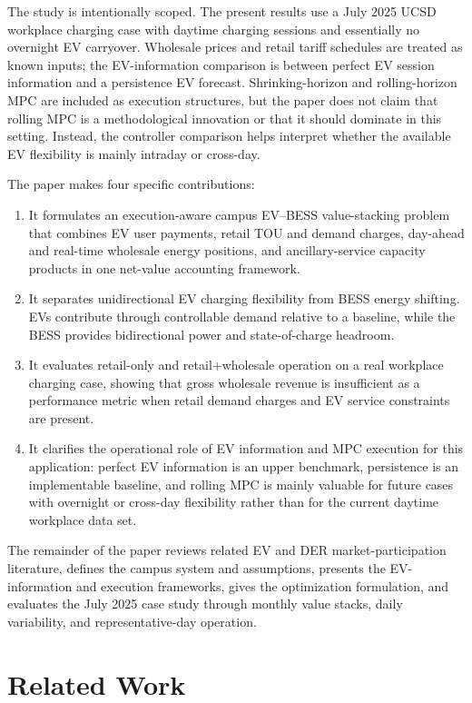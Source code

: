 \documentclass[final,5p,times]{elsarticle}
\begin{document}
The study is intentionally scoped. The present results use a July 2025 UCSD workplace charging case with daytime charging sessions and essentially no overnight EV carryover. Wholesale prices and retail tariff schedules are treated as known inputs; the EV-information comparison is between perfect EV session information and a persistence EV forecast. Shrinking-horizon and rolling-horizon MPC are included as execution structures, but the paper does not claim that rolling MPC is a methodological innovation or that it should dominate in this setting. Instead, the controller comparison helps interpret whether the available EV flexibility is mainly intraday or cross-day.

The paper makes four specific contributions:
\begin{enumerate}[leftmargin=*]
    \item It formulates an execution-aware campus EV--BESS value-stacking problem that combines EV user payments, retail TOU and demand charges, day-ahead and real-time wholesale energy positions, and ancillary-service capacity products in one net-value accounting framework.
    \item It separates unidirectional EV charging flexibility from BESS energy shifting. EVs contribute through controllable demand relative to a baseline, while the BESS provides bidirectional power and state-of-charge headroom.
    \item It evaluates retail-only and retail+wholesale operation on a real workplace charging case, showing that gross wholesale revenue is insufficient as a performance metric when retail demand charges and EV service constraints are present.
    \item It clarifies the operational role of EV information and MPC execution for this application: perfect EV information is an upper benchmark, persistence is an implementable baseline, and rolling MPC is mainly valuable for future cases with overnight or cross-day flexibility rather than for the current daytime workplace data set.
\end{enumerate}

The remainder of the paper reviews related EV and DER market-participation literature, defines the campus system and assumptions, presents the EV-information and execution frameworks, gives the optimization formulation, and evaluates the July 2025 case study through monthly value stacks, daily variability, and representative-day operation.

\section{Related Work}
\label{sec:related_work}
\end{document}
